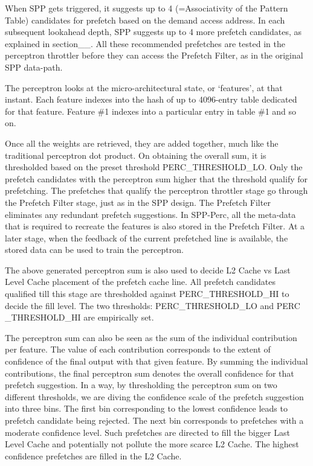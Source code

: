 When SPP gets triggered, it suggests up to 4 (=Associativity of the
Pattern Table) candidates for prefetch based on the demand access
address.  In each subsequent lookahead depth, SPP suggests up to 4
more prefetch candidates, as explained in section\_\_.  All these
recommended prefetches are tested in the perceptron throttler before
they can access the Prefetch Filter, as in the original SPP data-path.

The perceptron looks at the micro-architectural state, or `features',
at that instant.  Each feature indexes into the hash of up to
4096-entry table dedicated for that feature.  Feature \#1 indexes into
a particular entry in table \#1 and so on.

Once all the weights are retrieved, they are added together, much like
the traditional perceptron dot product.  On obtaining the overall sum,
it is thresholded based on the preset threshold PERC\_THRESHOLD\_LO.
Only the prefetch candidates with the perceptron sum higher that the
threshold qualify for prefetching.  The prefetches that qualify the
perceptron throttler stage go through the Prefetch Filter stage, just
as in the SPP design.  The Prefetch Filter eliminates any redundant
prefetch suggestions.  In SPP-Perc, all the meta-data that is required
to recreate the features is also stored in the Prefetch Filter.  At a
later stage, when the feedback of the current prefetched line is
available, the stored data can be used to train the perceptron.

The above generated perceptron sum is also used to decide L2 Cache vs
Last Level Cache placement of the prefetch cache line.  All prefetch
candidates qualified till this stage are thresholded against
PERC\_THRESHOLD\_HI to decide the fill level. The two thresholds:
PERC\_THRESHOLD\_LO and PERC \_THRESHOLD\_HI are empirically set.

The perceptron sum can also be seen as the sum of the individual
contribution per feature.  The value of each contribution corresponds
to the extent of confidence of the final output with that given
feature.  By summing the individual contributions, the final
perceptron sum denotes the overall confidence for that prefetch
suggestion.  In a way, by thresholding the perceptron sum on two
different thresholds, we are diving the confidence scale of the
prefetch suggestion into three bins.  The first bin corresponding to
the lowest confidence leads to prefetch candidate being rejected.  The
next bin corresponds to prefetches with a moderate confidence level.
Such prefetches are directed to fill the bigger Last Level Cache and
potentially not pollute the more scarce L2 Cache.  The highest
confidence prefetches are filled in the L2 Cache.

